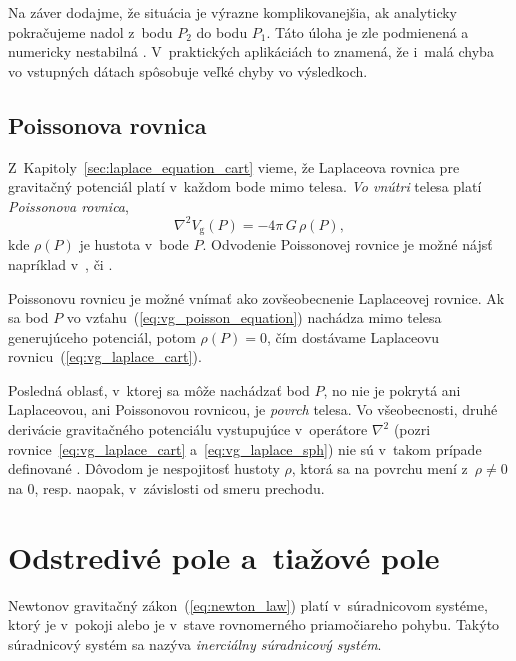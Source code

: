\documentclass[a4paper,12pt]{book}
\newcommand{\gidx}{\mathrm g}
\begin{document}
Na záver dodajme, že situácia je výrazne komplikovanejšia, ak analyticky 
pokračujeme nadol z~bodu $P_2$ do bodu $P_1$.  Táto úloha je zle podmienená 
a numericky nestabilná \parencite{SansoGeodeticBoundaryValueProblem}.  
V~praktických aplikáciách to znamená, že i~malá chyba vo vstupných dátach 
spôsobuje veľké chyby vo výsledkoch.






\subsection{Poissonova rovnica}
\label{sec:poisson_equation}

Z~Kapitoly~\ref{sec:laplace_equation_cart} vieme, že Laplaceova rovnica pre
gravitačný potenciál platí v~každom bode mimo telesa.  \emph{Vo vnútri} telesa
platí \emph{Poissonova rovnica},
%
\begin{equation}
\label{eq:vg_poisson_equation}
\nabla^2 V_\gidx(P) = -4 \pi \, G \, \rho(P){,}
\end{equation}
%
kde $\rho(P)$ je hustota v~bode $P$.  Odvodenie Poissonovej rovnice je možné
nájsť napríklad v~\textcite{MacMillan1930}, \textcite{Kellogg1967} či
\textcite{SansoGeoidDetermination}.

Poissonovu rovnicu je možné vnímať ako zovšeobecnenie Laplaceovej rovnice.  Ak
sa bod $P$ vo vzťahu~(\ref{eq:vg_poisson_equation}) nachádza mimo telesa
generujúceho potenciál, potom $\rho(P) = 0$, čím dostávame Laplaceovu
rovnicu~(\ref{eq:vg_laplace_cart}).

Posledná oblasť, v~ktorej sa môže nachádzať bod $P$, no nie je pokrytá ani 
Laplaceovou, ani Poissonovou rovnicou, je \emph{povrch} telesa.  Vo 
všeobecnosti, druhé derivácie gravitačného potenciálu vystupujúce v~operátore 
$\nabla^2$ (pozri rovnice~\ref{eq:vg_laplace_cart} a~\ref{eq:vg_laplace_sph}) 
nie sú v~takom prípade definované \parencite{Kellogg1967}.  Dôvodom je 
nespojitosť hustoty $\rho$, ktorá sa na povrchu mení z~$\rho \neq 0$ na 0, 
resp. naopak, v~závislosti od smeru prechodu.






\section{Odstredivé pole a~tiažové pole}
\label{sec:centrifugal_gravity_field}

Newtonov gravitačný zákon~(\ref{eq:newton_law}) platí v~súradnicovom systéme,
ktorý je v~pokoji alebo je v~stave rovnomerného priamočiareho pohybu.  Takýto
súradnicový systém sa nazýva \emph{inerciálny súradnicový systém}.
\end{document}
